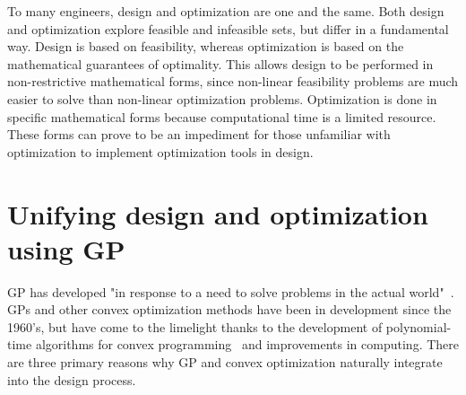 To many engineers, design and optimization are one and the same. Both design and
optimization explore feasible and infeasible sets, but differ in a fundamental way.
Design is based on feasibility, whereas optimization is based on the
mathematical guarantees of optimality. This allows design to be performed
in non-restrictive mathematical forms, since non-linear feasibility problems are
much easier to solve than non-linear optimization problems. Optimization is
done in specific mathematical forms because
computational time is a limited resource. These forms can prove to be
an impediment for those unfamiliar with optimization to implement optimization
tools in design.

\section{Unifying design and optimization using \gls{GP}}

\gls{GP} has developed "in response to a need to solve problems in the actual 
world"~\cite{duffingp}. \gls{GP}s and other convex optimization methods have been
in development since the 1960's, but have come to the limelight thanks to the development of
polynomial-time algorithms for convex programming~\cite{interior_point} and
improvements in computing. There are three primary reasons why \gls{GP} and convex
optimization naturally integrate into the design process.

